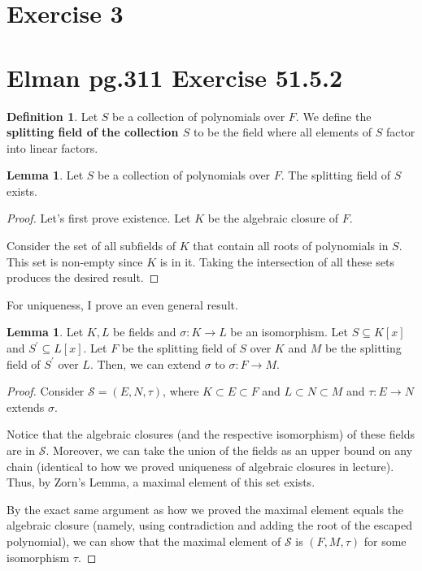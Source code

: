 \documentclass{article}
\theoremstyle{definition}
\newtheorem{definition}{Definition}
\newtheorem{lemma}[theorem]{Lemma}
\begin{document}
\newpage

\section{Exercise 3}



\newpage

\section{Elman pg.311 Exercise 51.5.2}

\begin{definition}
    Let $S$ be a collection of polynomials over $F$. We define the \textbf{splitting field
    of the collection $S$} to be the field where all elements of $S$ factor into linear factors.
\end{definition}

\begin{lemma}
    Let $S$ be a collection of polynomials over $F$. The splitting field of $S$
    exists.
\end{lemma}
\begin{proof}
    Let's first prove existence. Let $K$ be the
    algebraic closure of $F$.
    
    Consider the set of all subfields
    of $K$ that contain all roots of polynomials
    in $S$. This set is non-empty since
    $K$ is in it. Taking the intersection of all
    these sets produces the desired result.
\end{proof}

For uniqueness, I prove an even general result.

\begin{lemma}
    Let $K,L$ be fields and $\sigma: K \xrightarrow{} L$ be an isomorphism.
    Let $S \subseteq K[x]$ and $S^{\prime} \subseteq L[x]$.
    Let $F$ be the splitting field of $S$ over $K$ and $M$
    be the splitting field of $S^{\prime}$ over $L$. Then, we can
    extend $\sigma$ to $\sigma: F \xrightarrow{} M$.
\end{lemma}
\begin{proof}
    Consider $\mathcal{S} = (E,N,\tau)$, where
    $K \subset E \subset F$ and $L \subset N \subset M$
    and $\tau: E \xrightarrow{} N$ extends $\sigma$.

    Notice that the algebraic closures (and the respective
    isomorphism) of these fields are in $\mathcal{S}$.
    Moreover, we can take the union of the fields
    as an upper bound on any chain (identical to how we
    proved uniqueness of algebraic closures in lecture).
    Thus, by Zorn's Lemma, a maximal element of this
    set exists.

    By the exact same argument as how we proved the maximal
    element equals the algebraic closure (namely, using contradiction
    and adding the root of the escaped polynomial), we can
    show that the maximal element of $\mathcal{S}$
    is $(F,M, \tau)$ for some isomorphism $\tau$. 
\end{proof}
\end{document}
